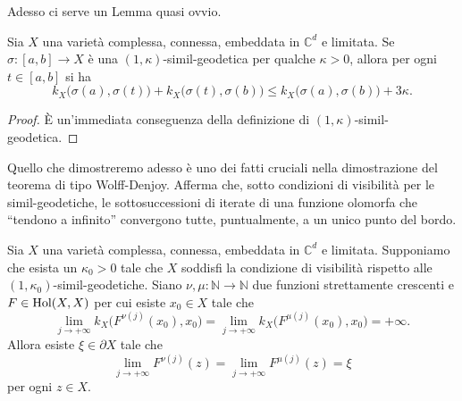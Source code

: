 Adesso ci serve un Lemma quasi ovvio.

\begin{lm} \label{quasiovvio}
    Sia $X$ una varietà complessa, connessa, embeddata in $\mathbb{C}^d$ e limitata. Se $\sigma:[a,b] \longrightarrow X$ è una $(1,\kappa)$-simil-geodetica per qualche $\kappa>0$, allora per ogni $t \in [a,b]$ si ha
    $$k_X\big(\sigma(a),\sigma(t)\big)+k_X\big(\sigma(t),\sigma(b)\big) \le k_X\big(\sigma(a),\sigma(b)\big)+3\kappa.$$
\end{lm}

\begin{proof}
    È un'immediata conseguenza della definizione di $(1,\kappa)$-simil-geodetica.
\end{proof}

Quello che dimostreremo adesso è uno dei fatti cruciali nella dimostrazione del teorema di tipo Wolff-Denjoy. Afferma che, sotto condizioni di visibilità per le simil-geodetiche, le sottosuccessioni di iterate di una funzione olomorfa che ``tendono a infinito'' convergono tutte, puntualmente, a un unico punto del bordo.

\begin{prop} \label{inf_impl_ugu}
    Sia $X$ una varietà complessa, connessa, embeddata in $\mathbb{C}^d$ e limitata. Supponiamo che esista un $\kappa_0>0$ tale che $X$ soddisfi la condizione di visibilità rispetto alle $(1,\kappa_0)$-simil-geodetiche. Siano $\nu,\mu:\mathbb{N}\longrightarrow\mathbb{N}$ due funzioni strettamente crescenti e $F\in\textnormal{Hol}(X,X)$ per cui esiste $x_0 \in X$ tale che
    $$\lim_{j\longrightarrow+\infty} k_X\big(F^{\nu(j)}(x_0),x_0\big)=\lim_{j\longrightarrow+\infty} k_X\big(F^{\mu(j)}(x_0),x_0\big)=+\infty.$$
    Allora esiste $\xi\in\partial X$ tale che
    $$\lim_{j\longrightarrow+\infty} F^{\nu(j)}(z)=\lim_{j\longrightarrow+\infty} F^{\mu(j)}(z)=\xi$$
    per ogni $z \in X$.
\end{prop}

